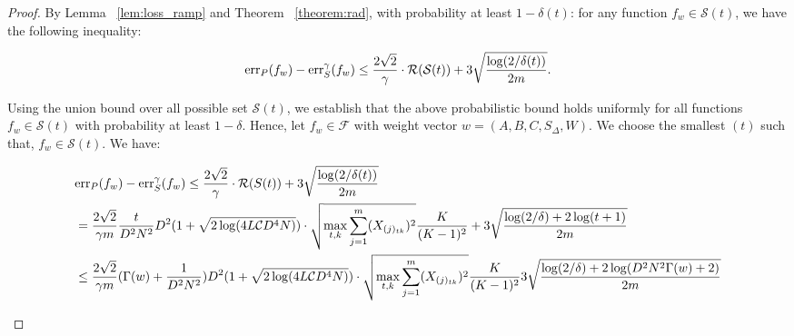 \begin{proof}
By Lemma ~\ref{lem:loss_ramp} and Theorem ~\ref{theorem:rad}, with probability at least $1-\delta(t)$:
for any function $f_w \in \mathcal{S}(t) $, we have the following inequality:
\begin{small}
\begin{equation*}
\begin{aligned}
\textnormal{err}_P(f_w) - \textnormal{err}^\gamma_S(f_w) \leq \frac{2\sqrt{2}}{\gamma} \cdot \mathcal{R}(\mathcal{S}(t)) + 3\sqrt{\frac{\log(2/\delta(t))}{2m}}.
\end{aligned}
\end{equation*}
\end{small}
Using the union bound over all possible set $\mathcal{S}(t)$, we establish that the above probabilistic bound holds uniformly for all functions $f_w \in \mathcal{S}(t)$ with probability at least $1 - \delta$.
Hence, let  $f_w \in \mathcal{F}$ with weight vector {$w = (A, B, C, S_{\Delta}, W)$}. We choose the smallest $(t)$ such that, $f_w \in \mathcal{S}(t)$. We have:
\begin{small}
\begin{equation*}
\begin{aligned}
&\textnormal{err}_P(f_w) - \textnormal{err}^\gamma_S(f_w) \leq \frac{2\sqrt{2}}{\gamma} \cdot \mathcal{R}(S(t)) + 3\sqrt{\frac{\log(2/\delta(t))}{2m}}
\\ &= \frac{2\sqrt{2}}{\gamma m} \frac{t}{D^2N^2} D^{2} (1 + \sqrt{2\log (4L \mathcal{C} D^4 N)})\cdot \sqrt{\max_{t, k} \sum_{j=1}^m (X_{(j)_{tk}})^2} \frac{K}{(K-1)^2} + 3\sqrt{\frac{\log(2/\delta)+2\log(t+1)}{2m}}
\\ &\leq \frac{2\sqrt{2}}{\gamma m} ({\Gamma(w) } +{\frac{1}{D^2N^2}}) D^{2} (1 + \sqrt{2\log (4L \mathcal{C} D^4 N)}) \cdot  \sqrt{\max_{t, k} \sum_{j=1}^m (X_{(j)_{tk}})^2} \frac{K}{(K-1)^2}  3\sqrt{\frac{\log(2/\delta)+2\log({D^2N^2\Gamma(w) }+2)}{2m}}
\end{aligned}
\end{equation*}
\end{small}
\end{proof}

